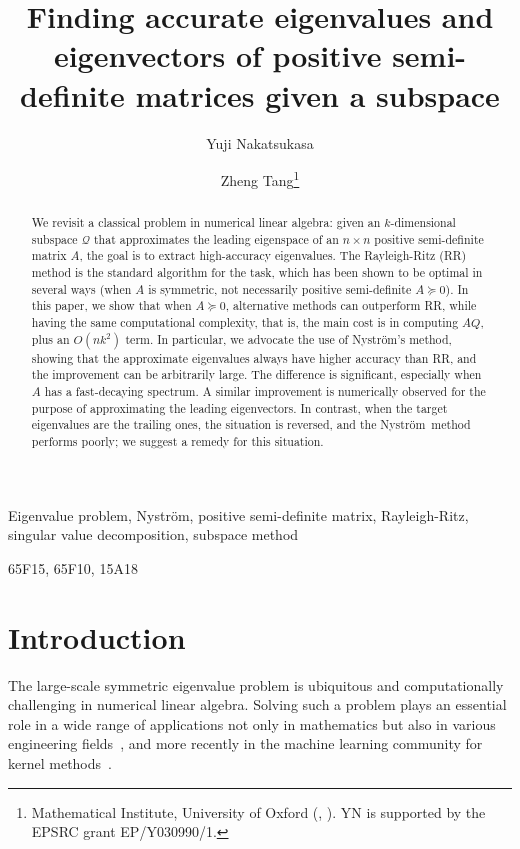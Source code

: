 \documentclass[onefignum,onetabnum]{siamart251216}
\title{Finding accurate eigenvalues and eigenvectors of positive semi-definite matrices given a subspace}
\author{%
Yuji Nakatsukasa \and
Zheng Tang\thanks{Mathematical Institute, University of Oxford
  (\email{nakatsukasa@maths.ox.ac.uk}, \email{zheng.tang@maths.ox.ac.uk}). YN is supported by the EPSRC grant EP/Y030990/1.}%
}
\def\subspace{\mathcal{Q}}
\def\Nystrom{Nystr{\"o}m}
\begin{document}
\maketitle
\begin{abstract}
We revisit a classical problem in numerical linear algebra: given an $k$-dimensional subspace $\subspace$ that approximates the leading eigenspace of an $n\times n$ positive semi-definite matrix $A$, the goal is to extract high-accuracy eigenvalues. The Rayleigh-Ritz (RR) method is the standard algorithm for the task, which has been shown to be optimal in several ways (when $A$ is symmetric, not necessarily positive semi-definite $A\succeq 0$). In this paper, we show that when $A\succeq 0$, alternative methods can outperform RR, while having the same computational complexity, that is, the main cost is in computing $AQ$, plus an $O(nk^2)$ term. In particular, we advocate the use of \Nystrom's method, showing that the approximate eigenvalues always have higher accuracy than RR, and the improvement can be arbitrarily large. The difference is significant, especially when $A$ has a fast-decaying spectrum. A similar improvement is numerically observed for the purpose of approximating the leading eigenvectors. In contrast, when the target eigenvalues are the trailing ones, the situation is reversed, and the \Nystrom\ method performs poorly; we suggest a remedy for this situation. 
\end{abstract}

\begin{keywords}
Eigenvalue problem, \Nystrom, positive semi-definite matrix, Rayleigh-Ritz, singular value decomposition, subspace method
\end{keywords}

\begin{MSCcodes}
65F15, 65F10, 15A18
\end{MSCcodes}

\tableofcontents


\section{Introduction}
The large-scale symmetric eigenvalue problem is ubiquitous and computationally challenging in numerical linear algebra. Solving such a problem plays an essential role in a wide range of applications not only in mathematics but also in various engineering fields~\cite{ambikasaran2015fast, axelsson2001finite, boffi2010finite, hu1985toeplitz, mastronardi1999computing, mena2018numerical}, and more recently in the machine learning community for kernel methods~\cite{belabbas2009spectral, gittens2016revisiting, williams2000using}.
\end{document}
